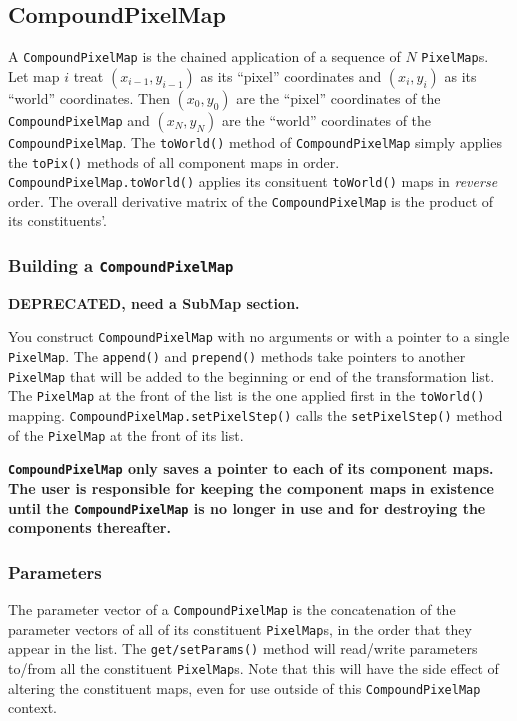 \documentclass[11pt,preprint,flushrt]{aastex}
\begin{document}
\subsection{CompoundPixelMap}
A {\tt CompoundPixelMap} is the chained application of a sequence of $N$ {\tt PixelMap}s.  Let map $i$ treat $(x_{i-1},y_{i-1})$ as its ``pixel'' coordinates and $(x_i,y_i)$ as its ``world'' coordinates.  Then $(x_0,y_0)$ are the ``pixel'' coordinates of the {\tt CompoundPixelMap} and $(x_N,y_N)$ are the ``world'' coordinates of the {\tt CompoundPixelMap}.  The {\tt toWorld()} method of {\tt CompoundPixelMap} simply applies the {\tt toPix()} methods of all component maps in order.  {\tt CompoundPixelMap.toWorld()} applies its consituent {\tt toWorld()} maps in {\em reverse} order.  The overall derivative matrix of the {\tt CompoundPixelMap} is the product of its constituents'.

\subsubsection{Building a {\tt CompoundPixelMap}}
{\bf DEPRECATED, need a SubMap section.}

You construct {\tt CompoundPixelMap} with no arguments or with a pointer to a single {\tt PixelMap}.  The {\tt append()} and {\tt prepend()} methods take pointers to another {\tt PixelMap} that will be added to the beginning or end of the transformation list.  The {\tt PixelMap} at the front of the list is the one applied first in the {\tt toWorld()} mapping.   {\tt CompoundPixelMap.setPixelStep()} calls the {\tt setPixelStep()} method of the {\tt PixelMap} at the front of its list.

{\bf {\tt CompoundPixelMap} only saves a pointer to each of its component maps.  The user is responsible for keeping the component maps in existence until the {\tt CompoundPixelMap} is no longer in use and for destroying the components thereafter.}

\subsubsection{Parameters}
The parameter vector of a {\tt CompoundPixelMap} is the concatenation of the parameter vectors of all of its constituent {\tt PixelMap}s, in the order that they appear in the list.  The {\tt get/setParams()} method will read/write parameters to/from all the constituent {\tt PixelMap}s.  Note that this will have the side effect of altering the constituent maps, even for use outside of this {\tt CompoundPixelMap} context.
\end{document}
